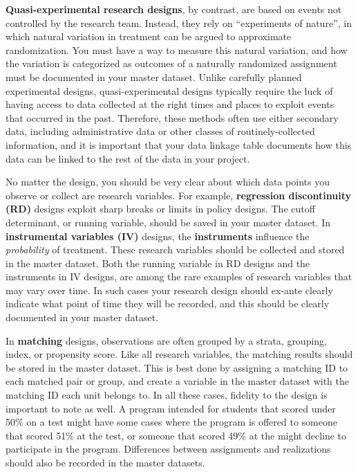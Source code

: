 \textbf{Quasi-experimental research designs},
by contrast, are based on events not controlled by the research team.
Instead, they rely on ``experiments of nature'',
in which natural variation in treatment can be argued to approximate randomization.
You must have a way to measure this natural variation,
and how the variation is categorized as outcomes of a naturally randomized assignment
must be documented in your master dataset.
Unlike carefully planned experimental designs,
quasi-experimental designs typically require the luck
of having access to data collected at the right times and places
to exploit events that occurred in the past.
Therefore, these methods often use either secondary data,
including administrative data or other classes of routinely-collected information,
and it is important that your data linkage table documents
how this data can be linked to the rest of the data in your project.



No matter the design, you should be very clear about
which data points you observe or collect are research variables.
For example,
\textbf{regression discontinuity (RD)}
designs exploit sharp breaks or limits
in policy designs.
The cutoff determinant, or running variable,
should be saved in your master dataset.
In \textbf{instrumental variables (IV)}
designs, the \textbf{instruments} influence the \textit{probability} of treatment.
These research variables should be collected
and stored in the master dataset.
Both the running variable in RD designs
and the instruments in IV designs,
are among the rare examples of research variables
that may vary over time.
In such cases your research design should
ex-ante clearly indicate what point of time they will be recorded,
and this should be clearly documented in your master dataset.

In \textbf{matching} designs, observations are often grouped
by a strata, grouping, index, or propensity score.
Like all research variables, the matching results
should be stored in the master dataset.
This is best done by assigning a matching ID
to each matched pair or group,
and create a variable in the master dataset
with the matching ID each unit belongs to.
In all these cases, fidelity to the design is important to note as well.
A program intended for students that scored under 50\% on a test
might have some cases where the program is offered to someone that scored 51\% at the test,
or someone that scored 49\% at the might decline to participate in the program.
Differences between assignments and realizations
should also be recorded in the master datasets.

